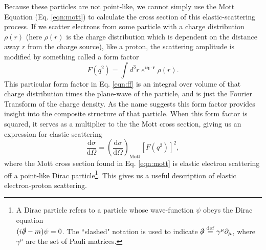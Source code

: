 Because these particles are not point-like, we cannot simply use the Mott Equation (Eq. \ref{eqn:mott}) to calculate the cross section of this elastic-scattering process. If we scatter electrons from some particle with a charge distribution $\rho(r)$ (here $\rho(r)$ is the charge distribution which is dependent on the distance away $r$ from the charge source), like a proton, the scattering amplitude is modified by something called a form factor
\begin{equation}
\label{eqn:ff}
F(q^2) = \int d^3r \; e^{i\mathbf{q} \cdot \mathbf{r}} \; \rho(r).
\end{equation}
This particular form factor in Eq. \ref{eqn:ff} is an integral over volume of that charge distribution times the plane-wave of the particle, and is just the Fourier Transform of the charge density. As the name suggests this form factor provides insight into the composite structure of that particle. When this form factor is squared, it serves as a multiplier to the the Mott cross section, giving us an expression for elastic scattering
\begin{equation}
\frac{\mathrm{d}\sigma}{\mathrm{d}\Omega} = \left( \frac{\mathrm{d}\sigma}{\mathrm{d}\Omega} \right)_{\mathrm{Mott}} [F(q^2)]^2,
\end{equation}
where the Mott cross section found in Eq. \ref{eqn:mott} is elastic electron scattering off a point-like Dirac particle\footnote{A Dirac particle refers to a particle whose wave-function $\psi$ obeys the Dirac equation \\ $(i\slashed{\partial} - m)\psi = 0$. The ``slashed" notation is used to indicate $\slashed{\partial} \overset{\mathrm{def}}{=}\gamma^{\mu} \partial_{\mu}$, where $\gamma^{\mu}$ are the set of Pauli matrices.}. This gives us a useful description of elastic electron-proton scattering.

